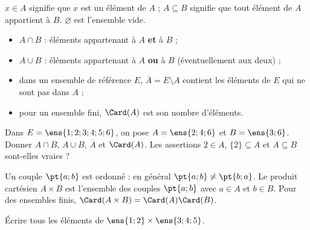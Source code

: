 \begin{keypoint}
$x\in A$ signifie que $x$ est un élément de $A$ ; $A\subseteq B$ signifie que tout élément de $A$ appartient à $B$. $\varnothing$ est l'ensemble vide.
\begin{itemize}
\item $A\cap B$ : éléments appartenant à $A$ \textbf{et} à $B$ ;
\item $A\cup B$ : éléments appartenant à $A$ \textbf{ou} à $B$ (éventuellement aux deux) ;
\item dans un ensemble de référence $E$, $\overline A=E\setminus A$ contient les éléments de $E$ qui ne sont pas dans $A$ ;
\item pour un ensemble fini, $\Card(A)$ est son nombre d'éléments.
\end{itemize}
\end{keypoint}
\begin{example}Dans $E=\ens{1;2;3;4;5;6}$, on pose $A=\ens{2;4;6}$ et $B=\ens{3;6}$. Donner $A\cap B$, $A\cup B$, $\overline A$ et $\Card(A)$. Les assertions $2\in A$, $\{2\}\subseteq A$ et $A\subseteq B$ sont-elles vraies ?\end{example}
\begin{keypoint}
Un couple $\pt{a;b}$ est ordonné : en général $\pt{a;b}\ne\pt{b;a}$. Le produit cartésien $A\times B$ est l'ensemble des couples $\pt{a;b}$ avec $a\in A$ et $b\in B$. Pour des ensembles finis, $\Card(A\times B)=\Card(A)\Card(B)$.
\end{keypoint}
\begin{example}Écrire tous les éléments de $\ens{1;2}\times\ens{3;4;5}$.\end{example}

